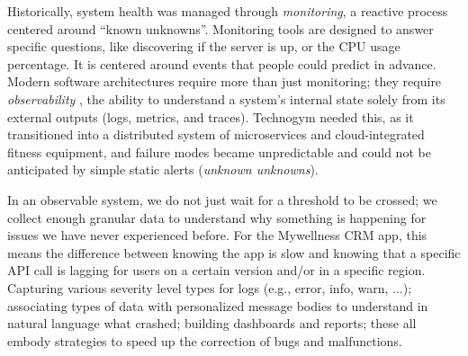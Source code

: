 \documentclass[12pt,a4paper,openright,twoside]{book}
\begin{document}
Historically, system health was managed through \textit{monitoring}, a reactive process centered around ``known unknowns''. Monitoring tools are designed to answer specific questions, like discovering if the server is up, or the CPU usage percentage. It is centered around events that people could predict in advance. Modern software architectures require more than just monitoring; they require \textit{observability} \cite{observability}, the ability to understand a system's internal state solely from its external outputs (logs, metrics, and traces). Technogym needed this, as it transitioned into a distributed system of microservices and cloud-integrated fitness equipment, and failure modes became unpredictable and could not be anticipated by simple static alerts (\textit{unknown unknowns}). 

In an observable system, we do not just wait for a threshold to be crossed; we collect enough granular data to understand why something is happening for issues we have never experienced before. For the Mywellness CRM app, this means the difference between knowing the app is slow and knowing that a specific API call is lagging for users on a certain version and/or in a specific region. Capturing various severity level types for logs (e.g., error, info, warn, ...); associating types of data with personalized message bodies to understand in natural language what crashed; building dashboards and reports; these all embody strategies to speed up the correction of bugs and malfunctions. 
\end{document}

